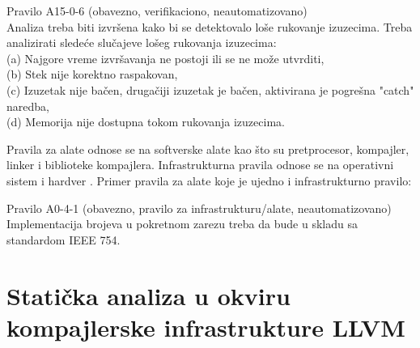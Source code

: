 \documentclass[12pt,oneside]{memoir}
\begin{document}
\begin{center}
\begin{tcolorbox}
Pravilo A15-0-6 (obavezno, verifikaciono, neautomatizovano) \\
Analiza treba biti izvršena kako bi se detektovalo loše rukovanje izuzecima. Treba analizirati slede\'ce slučajeve lošeg rukovanja izuzecima: \\
(a) Najgore vreme izvršavanja ne postoji ili se ne može utvrditi, \\
(b) Stek nije korektno raspakovan, \\
(c) Izuzetak nije bačen, drugačiji izuzetak je bačen, aktivirana je pogre\v{s}na "catch" naredba, \\
(d) Memorija nije dostupna tokom rukovanja izuzecima.
\end{tcolorbox}
\end{center}

Pravila za alate odnose se na softverske alate kao što su pretprocesor, kompajler, linker i biblioteke kompajlera.
Infrastrukturna pravila odnose se na operativni sistem i hardver \cite{AutosarGuidelines}.
Primer pravila za alate koje je ujedno i infrastrukturno pravilo:

\begin{center}
\begin{tcolorbox}
Pravilo A0-4-1 (obavezno, pravilo za infrastrukturu/alate, neautomatizovano) \\
Implementacija brojeva u pokretnom zarezu treba da bude u skladu sa standardom IEEE 754.
\end{tcolorbox}
\end{center}


\chapter{Stati\v{c}ka analiza u okviru kompajlerske infrastrukture LLVM}
\label{chp:llvm}
\end{document}
